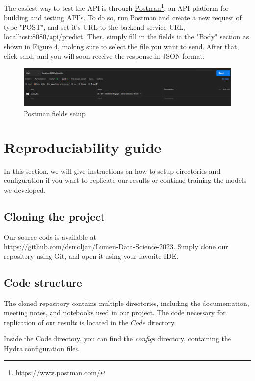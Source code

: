 \documentclass{ol-softwaremanual}
\newcommand{\doclink}[2]{\href{#1}{#2}\footnote{\url{#1}}}
\begin{document}
The easiest way to test the API is through \doclink{https://www.postman.com/}{Postman}, an API platform for building and testing API's. To do so, run Postman and create a new request of type "POST", and set it's URL to the backend service URL, \url{localhost:8080/api/predict}. Then, simply fill in the fields in the "Body" section as shown in Figure 4, making sure to select the file you want to send. After that, click send, and you will soon receive the response in JSON format.\\

\begin{figure}[h]
\centering
\includegraphics[width=1.0\textwidth]{images/postman_1.png}
\caption{\label{fig:wandb}Postman fields setup}
\end{figure}


\clearpage
\section{Reproduciability guide}

In this section, we will give instructions on how to setup directories and configuration if you want to replicate our results or continue training the models we developed. 

\subsection{Cloning the project}

Our source code is available at \\ \url{https://github.com/dsmoljan/Lumen-Data-Science-2023}. Simply clone our repository using Git, and open it using your favorite IDE.

\subsection{Code structure}

The cloned repository contains multiple directories, including the documentation, meeting notes, and notebooks used in our project. The code necessary for replication of our results is located in the \textit{Code} directory.

Inside the Code directory, you can find the \textit{configs} directory, containing the Hydra configuration files.
\end{document}
